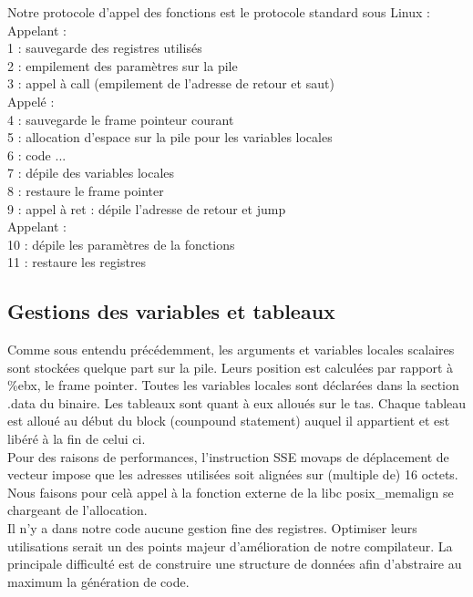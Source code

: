 \documentclass[a4paper, 11pt]{article}
\begin{document}
Notre protocole d'appel des fonctions est le protocole standard sous Linux :\\
Appelant :\\
1 : sauvegarde des registres utilisés\\
2 : empilement des paramètres sur la pile\\
3 : appel à call (empilement de l'adresse de retour et saut)\\
Appelé :\\
4 : sauvegarde le frame pointeur courant\\
5 : allocation d'espace sur la pile pour les variables locales\\
6 : code ...\\
7 : dépile des variables locales\\
8 : restaure le frame pointer\\
9 : appel à ret : dépile l'adresse de retour et jump\\
Appelant :\\
10 : dépile les paramètres de la fonctions\\
11 : restaure les registres\\

\subsection{Gestions des variables et tableaux}

Comme sous entendu précédemment, les arguments et variables locales scalaires sont stockées quelque part sur la pile. Leurs position est calculées
par rapport à \%ebx, le frame pointer.
Toutes les variables locales sont déclarées dans la section .data du binaire.
Les tableaux sont quant à eux alloués sur le tas. Chaque tableau est alloué au début du block (counpound statement) auquel il appartient et est
libéré à la fin de celui ci.\\
Pour des raisons de performances, l'instruction SSE movaps de déplacement de vecteur impose
que les adresses utilisées soit alignées sur (multiple de) 16 octets. Nous faisons pour celà appel à la fonction externe de la libc posix\_memalign
se chargeant de l'allocation.\\

Il n'y a dans notre code aucune gestion fine des registres. Optimiser leurs utilisations serait un des points majeur d'amélioration de notre
compilateur. La principale difficulté est de construire une structure de données afin d'abstraire au maximum la génération de code.
\end{document}
